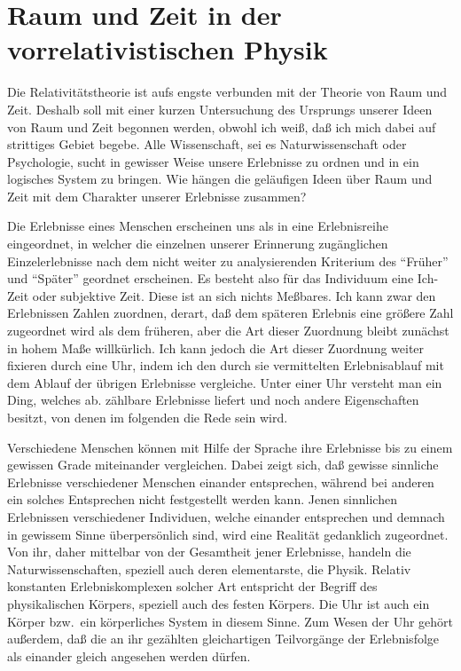 %
%

\section{Raum und Zeit in der vorrelativistischen Physik}
\label{sec:rau-1}

Die Relativitätstheorie ist aufs engste verbunden mit der Theorie von Raum und Zeit. Deshalb soll mit einer kurzen Untersuchung des Ursprungs unserer Ideen von Raum und Zeit begonnen werden, obwohl ich weiß, daß ich mich dabei auf strittiges Gebiet begebe. Alle Wissenschaft, sei es Naturwissenschaft oder Psychologie, sucht in gewisser Weise unsere Erlebnisse zu ordnen und in ein logisches System zu bringen. Wie hängen die geläufigen Ideen über Raum und Zeit mit dem Charakter unserer Erlebnisse zusammen?

Die Erlebnisse eines Menschen erscheinen uns als in eine Erlebnisreihe eingeordnet, in welcher die einzelnen unserer Erinnerung zugänglichen Einzelerlebnisse nach dem nicht weiter zu analysierenden Kriterium des \enquote{Früher} und \enquote{Später} geordnet erscheinen. Es besteht also für das Individuum eine Ich-Zeit oder subjektive Zeit. Diese ist an sich nichts Meßbares. Ich kann zwar den Erlebnissen Zahlen zuordnen, derart, daß dem späteren Erlebnis eine größere Zahl zugeordnet wird als dem früheren, aber die Art dieser Zuordnung bleibt zunächst in hohem Maße willkürlich. Ich kann jedoch die Art dieser Zuordnung weiter fixieren durch eine Uhr, indem ich den durch sie vermittelten Erlebnisablauf mit dem Ablauf der übrigen Erlebnisse vergleiche. Unter einer Uhr versteht man ein Ding, welches ab. zählbare Erlebnisse liefert und noch andere Eigenschaften besitzt, von denen im folgenden die Rede sein wird.

Verschiedene Menschen können mit Hilfe der Sprache ihre Erlebnisse bis zu einem gewissen Grade miteinander vergleichen. Dabei zeigt sich, daß gewisse sinnliche Erlebnisse verschiedener Menschen einander entsprechen, während bei anderen ein solches Entsprechen nicht festgestellt werden kann. Jenen sinnlichen Erlebnissen verschiedener Individuen, welche einander entsprechen und demnach in gewissem Sinne überpersönlich sind, wird eine Realität gedanklich zugeordnet. Von ihr, daher mittelbar von der Gesamtheit jener Erlebnisse, handeln die Naturwissenschaften, speziell auch deren elementarste, die Physik. Relativ konstanten Erlebniskomplexen solcher Art entspricht der Begriff des physikalischen Körpers, speziell auch des festen Körpers. Die Uhr ist auch ein Körper bzw.\ ein körperliches System in diesem Sinne. Zum Wesen der Uhr gehört außerdem, daß die an ihr gezählten gleichartigen Teilvorgänge der Erlebnisfolge als einander gleich angesehen werden dürfen.

